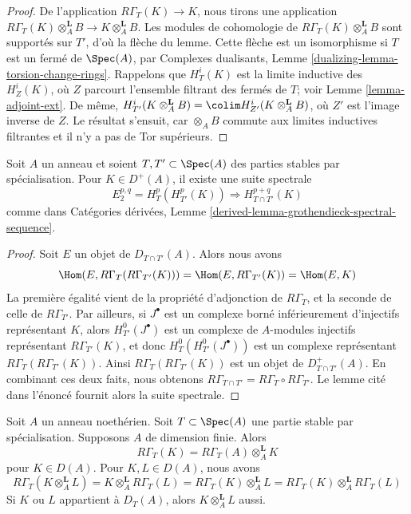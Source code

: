 \begin{proof}
De l'application $R\Gamma_T(K) \to K$, nous tirons une application
$R\Gamma_T(K) \otimes_A^\mathbf{L} B \to K \otimes_A^\mathbf{L} B$.
Les modules de cohomologie de $R\Gamma_T(K) \otimes_A^\mathbf{L} B$
sont supportés sur $T'$, d'où la flèche du lemme.
Cette flèche est un isomorphisme si $T$ est un fermé de $\Spec(A)$, par
Complexes dualisants, Lemme \ref{dualizing-lemma-torsion-change-rings}.
Rappelons que $H^i_T(K)$ est la limite inductive des $H^i_Z(K)$, où $Z$ parcourt
l'ensemble filtrant des fermés de $T$; voir
Lemme \ref{lemma-adjoint-ext}.
De même,
$H^i_{T'}(K \otimes_A^\mathbf{L} B) =
\colim H^i_{Z'}(K \otimes_A^\mathbf{L} B)$, où $Z'$ est l'image
inverse de $Z$. Le résultat s'ensuit, car $\otimes_A B$ commute
aux limites inductives filtrantes et il n'y a pas de Tor supérieurs.
\end{proof}

\begin{lemma}
\label{lemma-local-cohomology-ss}
Soit $A$ un anneau et soient $T, T' \subset \Spec(A)$ des parties
stables par spécialisation. Pour $K \in D^+(A)$,
il existe une suite spectrale
$$
E_2^{p, q} = H^p_T(H^p_{T'}(K)) \Rightarrow H^{p + q}_{T \cap T'}(K)
$$
comme dans Catégories dérivées, Lemme
\ref{derived-lemma-grothendieck-spectral-sequence}.
\end{lemma}

\begin{proof}
Soit $E$ un objet de $D_{T \cap T'}(A)$. Alors nous avons
$$
\Hom(E, R\Gamma_T(R\Gamma_{T'}(K))) =
\Hom(E, R\Gamma_{T'}(K)) =
\Hom(E, K)
$$
La première égalité vient de la propriété d'adjonction de $R\Gamma_T$,
et la seconde de celle de $R\Gamma_{T'}$.
Par ailleurs, si $J^\bullet$ est un complexe borné inférieurement
d'injectifs représentant $K$, alors $H^0_{T'}(J^\bullet)$
est un complexe de $A$-modules injectifs représentant $R\Gamma_{T'}(K)$,
et donc $H^0_T(H^0_{T'}(J^\bullet))$ est un complexe représentant
$R\Gamma_T(R\Gamma_{T'}(K))$. Ainsi $R\Gamma_T(R\Gamma_{T'}(K))$
est un objet de $D^+_{T \cap T'}(A)$. En combinant ces deux
faits, nous obtenons $R\Gamma_{T \cap T'} = R\Gamma_T \circ R\Gamma_{T'}$.
Le lemme cité dans l'énoncé fournit alors la suite spectrale.
\end{proof}

\begin{lemma}
\label{lemma-torsion-tensor-product}
Soit $A$ un anneau noethérien. Soit $T \subset \Spec(A)$ une partie
stable par spécialisation. Supposons $A$ de dimension finie. Alors
$$
R\Gamma_T(K) = R\Gamma_T(A) \otimes_A^\mathbf{L} K
$$
pour $K \in D(A)$. Pour $K, L \in D(A)$, nous avons
$$
R\Gamma_T(K \otimes_A^\mathbf{L} L) =
K \otimes_A^\mathbf{L} R\Gamma_T(L) =
R\Gamma_T(K) \otimes_A^\mathbf{L} L =
R\Gamma_T(K) \otimes_A^\mathbf{L} R\Gamma_T(L)
$$
Si $K$ ou $L$ appartient à $D_T(A)$, alors $K \otimes_A^\mathbf{L} L$ aussi.
\end{lemma}

